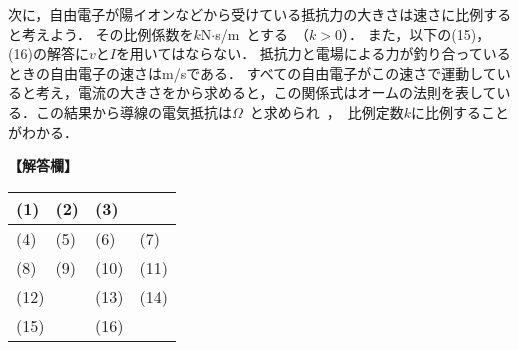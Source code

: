 次に，自由電子が陽イオンなどから受けている抵抗力の大きさは速さに比例すると考えよう．
その比例係数を$k$\unit{N$\cdot$s/m}とする（$k>0$）．
また，以下の(15)，(16)の解答に$v$と$I$を用いてはならない．
抵抗力と電場による力が釣り合っているときの自由電子の速さは\unit{m/s}である．
すべての自由電子がこの速さで運動していると考え，電流の大きさをから求めると，この関係式はオームの法則を表している．この結果から導線の電気抵抗は\unit{$\Omega$}と求められ，比例定数$k$に比例することがわかる．

\vspace{\baselineskip}


\noindent
\textbf{【解答欄】}
\begingroup
\renewcommand{\arraystretch}{2}
\begin{table}[H]
  \centering
  \begin{tabular}{|p{}|p{}|p{}|p{}|}\hline
    (1)	& (2) & \multicolumn{2}{|l|}{(3)}\\\hline
    (4) &	(5)	& (6)	& (7) \\\hline
    (8)	& (9)	& (10) & (11) \\\hline
    \multicolumn{2}{|l|}{(12)} & (13) & (14) \\\hline
    \multicolumn{2}{|l|}{(15)} &	\multicolumn{2}{|l|}{(16)}\\\hline
  \end{tabular}
\end{table}
\endgroup


\begin{comment}
\noindent
\textbf{【解答】}
\begingroup
\renewcommand{\arraystretch}{2}
\begin{table}[H]
  \centering
  \begin{tabular}{|p{.2\textwidth}|p{.2\textwidth}|p{.2\textwidth}|p{.2\textwidth}|}\hline
    (1)	半導体& (2) 静電誘導& \multicolumn{2}{|l|}{(3) 全体が等電位}\\\hline
    (4) 誘電分極&	(5)	弱め& (6)	小さく& (7) 大きく\\\hline
    (8)	$eNAv$& (9)	$\dfrac{V}{L}$& (10) $\dfrac{eV}{L}$& (11) $\dfrac{evV}{L}$\\\hline
    \multicolumn{2}{|l|}{(12) ジュール熱} & (13) $eNAvV$& (14) $IV$\\\hline
    \multicolumn{2}{|l|}{(15) $\dfrac{eV}{kL}$} &	\multicolumn{2}{|l|}{(16) $\dfrac{k}{e^2n}\dfrac{L}{A}$}\\\hline
  \end{tabular}
\end{table}
\endgroup
\end{comment}



\begin{comment}

\end{comment}


